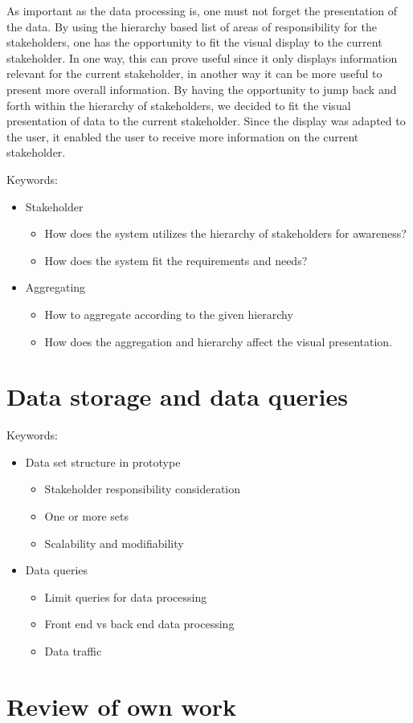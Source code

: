 As important as the data processing is, one must not forget the presentation of
the data. By using the hierarchy based list of areas of responsibility for the
stakeholders, one has the opportunity to fit the visual display to the current
stakeholder. In one way, this can prove useful since it only displays
information relevant for the current stakeholder, in another way it can be more
useful to present more overall information. By having the opportunity to jump
back and forth within the hierarchy of stakeholders, we decided to fit the visual
presentation of data to the current stakeholder. Since the display was adapted to the user, it enabled the user to receive more information on the current
stakeholder.



Keywords:
\begin{itemize}
	\item Stakeholder
	\begin{itemize}
		\item How does the system utilizes the hierarchy of stakeholders for awareness?
		\item How does the system fit the requirements and needs?
	\end{itemize}
	\item Aggregating
	\begin{itemize}
		\item How to aggregate according to the given hierarchy
		\item How does the aggregation and hierarchy affect the visual presentation.
	\end{itemize}
\end{itemize}


\section{Data storage and data queries} %
\label{sec:discussion_data_storage_and_data_queries}
Keywords:
\begin{itemize}
	\item Data set structure in prototype
	\begin{itemize}
		\item Stakeholder responsibility consideration
		\item One or more sets
		\item Scalability and modifiability
	\end{itemize}
	\item Data queries
	\begin{itemize}
		\item Limit queries for data processing
		\item Front end vs back end data processing
		\item Data traffic
	\end{itemize}
\end{itemize}

\section{Review of own work} %
\label{sec:review_of_own_work}
